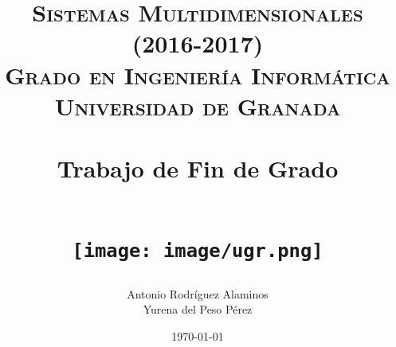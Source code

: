 


\title{	
\normalfont \normalsize 
\textsc{\textbf{Sistemas Multidimensionales (2016-2017)} \\ Grado en Ingeniería Informática \\ Universidad de Granada} \\ [25pt] %
\horrule{0.5pt} \\[0.4cm] %
\huge Trabajo de Fin de Grado \\ %
\horrule{2pt} \\[0.5cm] %
\begin{figure}[H] %
	\centering
	\texttt{[image: image/ugr.png]}  %
\end{figure}
}

\author{Antonio Rodríguez Alaminos \\ Yurena del Peso Pérez} %

\date{\normalsize\today} %





\maketitle %

\newpage %

\tableofcontents %


